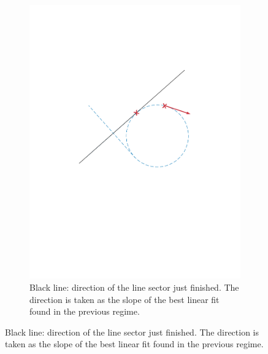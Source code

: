 \begin{figure}[!htbp]
\begin{subfigure}[b]{0.45\textwidth}
        \includegraphics[width=\textwidth]{img/intersection_2.pdf}
        \caption{Black line: direction of the line sector just finished. The direction is taken as the slope of the best linear fit found in the previous regime.}
        \label{fig:two}
   \end{subfigure}
   

\end{figure}
